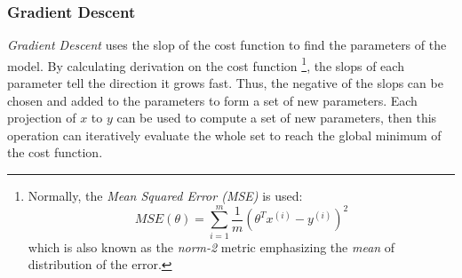 \documentclass[12pt,a4paper]{report}
\begin{document}



        \subsubsection{Gradient Descent}
        \emph{Gradient Descent} uses the slop of the cost function to find the parameters of the model. By calculating derivation on the cost function \footnote{Normally, the \emph{Mean Squared Error (MSE)} is used: $$MSE(\theta)=\sum_{i=1}^m\frac{1}{m}(\theta^T x^{(i)} - y^{(i)})^2$$ which is also known as the \emph{norm-2} metric emphasizing the \emph{mean} of distribution of the error.}, the slops of each parameter tell the direction it grows fast. Thus, the negative of the slops can be chosen and added to the parameters to form a set of new parameters. Each projection of $x$ to $y$ can be used to compute a set of new parameters, then this operation can iteratively evaluate the whole set to reach the global minimum of the cost function.

\end{document}
